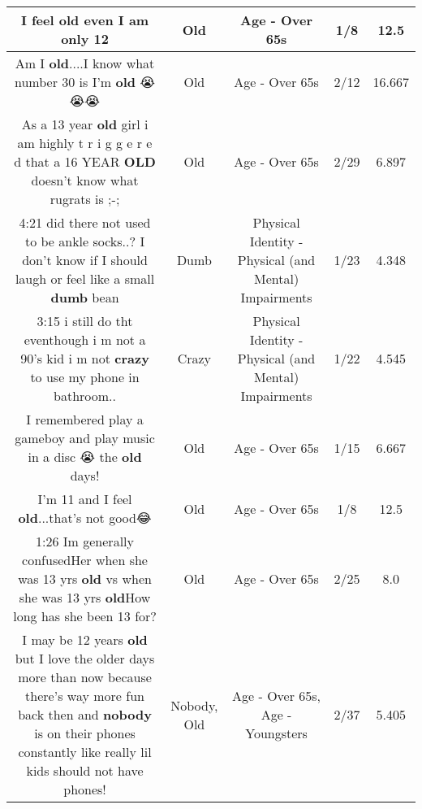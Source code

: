 \documentclass[11pt]{article}
\newlength\mylength
\begin{document}
\begin{center}
\begin{longtable}{|C{.65\mylength}|C{.30\mylength}|C{.12\mylength}|C{.12\mylength}|C{.12\mylength}|}
  \small I feel \textbf{old} even I am only 12\normalsize   & Old & Age - Over 65s & 1/8 & 12.5 \\  \hline
  \small Am I \textbf{old}....I know what number 30 is I'm \textbf{old} 😭😭😭\normalsize   & Old & Age - Over 65s & 2/12 & 16.667 \\  \hline
  \small As a 13 year \textbf{old} girl i am highly t r i g g e r e d that a 16 YEAR \textbf{OLD} doesn't know what rugrats is ;-;\normalsize   & Old & Age - Over 65s & 2/29 & 6.897 \\  \hline
  \small 4:21 did there not used to be ankle socks..? I don't know if I should laugh or feel like a small \textbf{dumb} bean\normalsize   & Dumb & Physical Identity - Physical (and Mental) Impairments & 1/23 & 4.348 \\  \hline
  \small 3:15 i still do tht eventhough i m not a 90's kid i m not \textbf{crazy} to use my phone in bathroom..\normalsize   & Crazy & Physical Identity - Physical (and Mental) Impairments & 1/22 & 4.545 \\  \hline
  \small I remembered play a gameboy and play music in a disc 😭 the \textbf{old} days!\normalsize   & Old & Age - Over 65s & 1/15 & 6.667 \\  \hline
  \small I'm 11 and I feel \textbf{old}...that's not good😂\normalsize   & Old & Age - Over 65s & 1/8 & 12.5 \\  \hline
  \small 1:26 Im generally confusedHer when she was 13 yrs \textbf{old} vs when she was 13 yrs \textbf{old}How long has she been 13 for?\normalsize   & Old & Age - Over 65s & 2/25 & 8.0 \\  \hline
  \small I may be 12 years \textbf{old} but I love the older days more than now because there's way more fun back then and \textbf{nobody} is on their phones constantly like really lil kids should not have phones!\normalsize   & Nobody, Old & Age - Over 65s, Age - Youngsters & 2/37 & 5.405 \\  \hline

\end{longtable}
\end{center}
\end{document}

